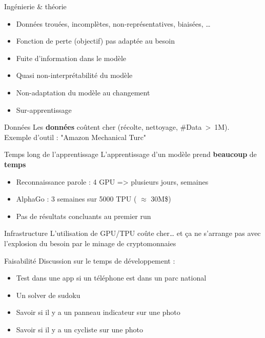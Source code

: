 \begin{frame}{Ingénierie \& théorie}
  \begin{itemize}[<+->]
    \item Données trouées, incomplètes, non-représentatives, biaisées, …
    \item Fonction de perte (objectif) pas adaptée au besoin
    \item Fuite d'information dans le modèle
    \item Quasi non-interprétabilité du modèle
    \item Non-adaptation du modèle au changement
    \item Sur-apprentissage
  \end{itemize}
\end{frame}

\begin{frame}{Données}
  Les \textbf{données} coûtent cher (récolte, nettoyage, \#Data~>~1M). \\
  Exemple d'outil : "Amazon Mechanical Turc"
\end{frame}

\begin{frame}{Temps long de l'apprentissage}
  L'apprentissage d'un modèle prend \textbf{beaucoup} de \textbf{temps}
  \begin{itemize}[<+->]
    \item Reconnaissance parole : 4 GPU => plusieurs jours, semaines
    \item AlphaGo : 3 semaines sur 5000 TPU ( $\approx$ 30M\$)
    \item Pas de résultats concluants au premier run
  \end{itemize}
\end{frame}

\begin{frame}{Infrastructure}
  L'utilisation de GPU/TPU coûte cher… et ça ne s'arrange pas avec l'explosion du besoin par le minage de cryptomonnaies
\end{frame}

\begin{frame}{Faisabilité}
  Discussion sur le temps de développement :
  \begin{itemize}
    \item Test dans une app si un téléphone est dans un parc national
    \item Un solver de sudoku
    \item Savoir si il y a un panneau indicateur sur une photo
    \item Savoir si il y a un cycliste sur une photo
  \end{itemize}
\end{frame}

